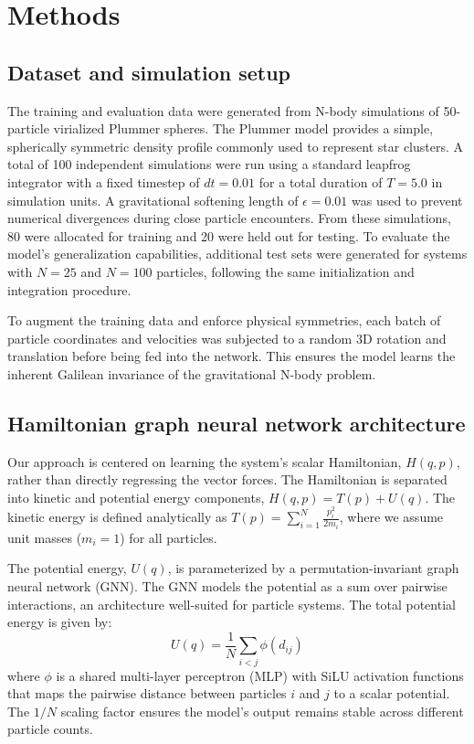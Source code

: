 \documentclass[]{article}
\begin{document}
\section{Methods}
\label{sec:methods}
\subsection{Dataset and simulation setup}
The training and evaluation data were generated from N-body simulations of 50-particle virialized Plummer spheres. The Plummer model provides a simple, spherically symmetric density profile commonly used to represent star clusters. A total of 100 independent simulations were run using a standard leapfrog integrator with a fixed timestep of $dt=0.01$ for a total duration of $T=5.0$ in simulation units. A gravitational softening length of $\epsilon=0.01$ was used to prevent numerical divergences during close particle encounters. From these simulations, 80 were allocated for training and 20 were held out for testing. To evaluate the model's generalization capabilities, additional test sets were generated for systems with $N=25$ and $N=100$ particles, following the same initialization and integration procedure.

To augment the training data and enforce physical symmetries, each batch of particle coordinates and velocities was subjected to a random 3D rotation and translation before being fed into the network. This ensures the model learns the inherent Galilean invariance of the gravitational N-body problem.

\subsection{Hamiltonian graph neural network architecture}
Our approach is centered on learning the system's scalar Hamiltonian, $H(q, p)$, rather than directly regressing the vector forces. The Hamiltonian is separated into kinetic and potential energy components, $H(q, p) = T(p) + U(q)$. The kinetic energy is defined analytically as $T(p) = \sum_{i=1}^{N} \frac{p_i^2}{2m_i}$, where we assume unit masses ($m_i=1$) for all particles.

The potential energy, $U(q)$, is parameterized by a permutation-invariant graph neural network (GNN). The GNN models the potential as a sum over pairwise interactions, an architecture well-suited for particle systems. The total potential energy is given by:
\begin{equation}
    U(q) = \frac{1}{N} \sum_{i<j} \phi(d_{ij})
\end{equation}
where $\phi$ is a shared multi-layer perceptron (MLP) with SiLU activation functions that maps the pairwise distance between particles $i$ and $j$ to a scalar potential. The $1/N$ scaling factor ensures the model's output remains stable across different particle counts.
\end{document}
